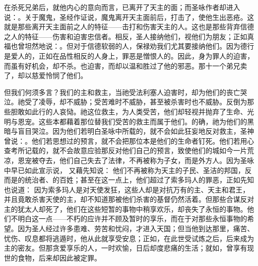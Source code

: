 在杀死兄弟后，就他内心的意向而言，已离开了天主的面；而圣咏作者却进入说：。关于魔鬼，圣经作证说，魔鬼离开天主面前后，打击了，使他生出恶疮。这就是那些离开天主面前之人的特征——击打和伤害天主的人。这也是那些背弃信德之人的特征——伤害和迫害忠信者。相反，圣人接纳他们，视他们为朋友；正如真福也曾坦然地说：。但对于信德软弱的人，保禄劝我们尤其要接纳他们。因为德行是爱人的，正如在品性相反的人身上，罪恶是憎恨人的。因此，身为罪人的迫害，而虽有好机会，却不杀。也迫害，而却以温和胜过了他的邪恶。那十一个弟兄卖了，却以慈爱怜悯了他们。\par

但我们何须多言？我们的主和救主，当祂受法利塞人迫害时，却为他们的丧亡哭泣。祂受了凌辱，却不威胁；受苦难时不威胁，甚至被杀害时也不威胁。反倒为那些胆敢如此行的人哀恸。祂这位救主，为人类受苦，他们却轻视并抛弃了生命、光明与恩宠。这些本都藉着那位替我们受苦的救主而属于他们。的确，祂为他们的黑暗与盲目哭泣。因为他们若明白圣咏中所载的，就不会如此狂妄地反对救主，圣神曾说：。他们若思想过的预言，就不会把那位本是他们的生命者钉死。他们若用心查考所记载的，就不会故意应验那反对他们自己的预言，致使他们的城如今一片荒凉，恩宠被夺去，他们自己失去了法律，不再被称为子女，而是外方人。因为圣咏中早已如此宣示说， 又藉先知说： 他们不再被称为天主的子民、圣洁的邦国，反而是的统治者、的百姓；甚至在这一点上，他们超过了索多玛人的罪恶，正如先知也说道： 因为索多玛人是对天使发狂，这些人却是对抗万有的主、天主和君王，并且竟敢杀害天使的主，却不知道那被他们杀害的基督仍然活着。但那些合谋反对主的犹太人却死了，他们在这些短暂的事物中稍享欢乐，却丧失了永恒的事物。他们不明白这一点——不朽的应许并不顾及暂时的享乐，而在于对那些永恒事物的希望。因为圣人经过许多患难、劳苦和忧闷，才进入天国；但当他到达那里，痛苦、忧伤、叹息都将逃遁时，他从此就享受安息；正如，在此世受试炼之后，后来成为主的密友。但那贪爱享乐的人，一时欢愉，日后却度悲痛的生活；就如，曾享有现世的食物，后来却因此被定罪。\par

